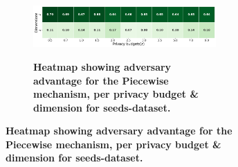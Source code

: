 \begin{figure}[H]
\begin{subfigure}[b]{0.85\textwidth}
        \begin{subfigure}[c]{1\textwidth}
            \caption{\textbf{Heatmap showing adversary advantage for the Piecewise mechanism, per privacy budget \& dimension for seeds-dataset.}}
            \includegraphics[width=1\textwidth]{Results/kd-laplace/piecewise/line-dataset/shokri_mi_adv.png}
            \label{fig:privacy_line-dataset_adversial_advantage_piecewise}
        \end{subfigure}
    \end{subfigure}
    \hfill %
    \begin{subfigure}[b]{0.075\textwidth}

\end{subfigure}
\end{figure}
